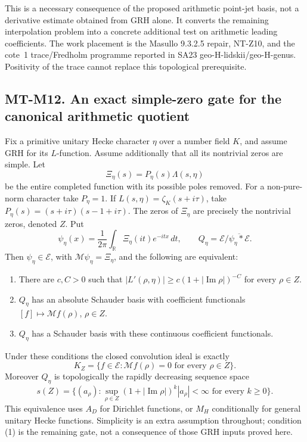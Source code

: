 This is a necessary consequence of the proposed arithmetic
point-jet basis, not a derivative estimate obtained from GRH
alone. It converts the remaining interpolation problem into
a concrete additional test on arithmetic leading coefficients.
The work placement is the Masullo 9.3.2.5 repair, NT-Z10,
and the cote~1 trace/Fredholm programme reported in SA23
geo-H-lidskii/geo-H-genus. Positivity of the trace cannot
replace this topological prerequisite.

\subsection*{MT-M12. An exact simple-zero gate for the canonical arithmetic quotient}
Fix a primitive unitary Hecke character $\eta$ over a number field
$K$, and assume GRH for its $L$-function. Assume additionally that
all its nontrivial zeros are simple. Let
\[
 \Xi_\eta(s)=P_\eta(s)\Lambda(s,\eta)
\]
be the entire completed function with its possible poles removed.
For a non-pure-norm character take $P_\eta=1$. If
$L(s,\eta)=\zeta_K(s+i\tau)$, take
$P_\eta(s)=(s+i\tau)(s-1+i\tau)$.
The zeros of $\Xi_\eta$ are precisely the nontrivial zeros, denoted
$Z$. Put
\[
 \psi_\eta(x)=\frac1{2\pi}\int_{\mathbb R}\Xi_\eta(it)e^{-itx}\,dt,
 \qquad Q_\eta=\mathcal E/\overline{\psi_\eta*\mathcal E}.
\]
Then $\psi_\eta\in\mathcal E$, with
$\mathcal M\psi_\eta=\Xi_\eta$, and the following are equivalent:
\begin{enumerate}
\item There are $c,C>0$ such that
$|L'(\rho,\eta)|\ge c(1+|\operatorname{Im}\rho|)^{-C}$ for
every $\rho\in Z$.
\item $Q_\eta$ has an absolute Schauder basis with coefficient
functionals $[f]\mapsto\mathcal Mf(\rho)$, $\rho\in Z$.
\item $Q_\eta$ has a Schauder basis with these continuous
coefficient functionals.
\end{enumerate}
Under these conditions the closed convolution ideal is exactly
\[
 K_Z=\{f\in\mathcal E:\mathcal Mf(\rho)=0
                              \text{ for every }\rho\in Z\}. \tag{MT-M12a}
\]
Moreover $Q_\eta$ is topologically the rapidly decreasing sequence
space
\[
 s(Z)=\{(a_\rho):\sup_{\rho\in Z}
       (1+|\operatorname{Im}\rho|)^k|a_\rho|<\infty
                                  \text{ for every }k\ge0\}. \tag{MT-M12b}
\]
This equivalence uses $A_D$ for Dirichlet functions, or $M_H$
conditionally for general unitary Hecke functions. Simplicity is
an extra assumption throughout; condition (1) is the remaining
gate, not a consequence of those GRH inputs proved here.

